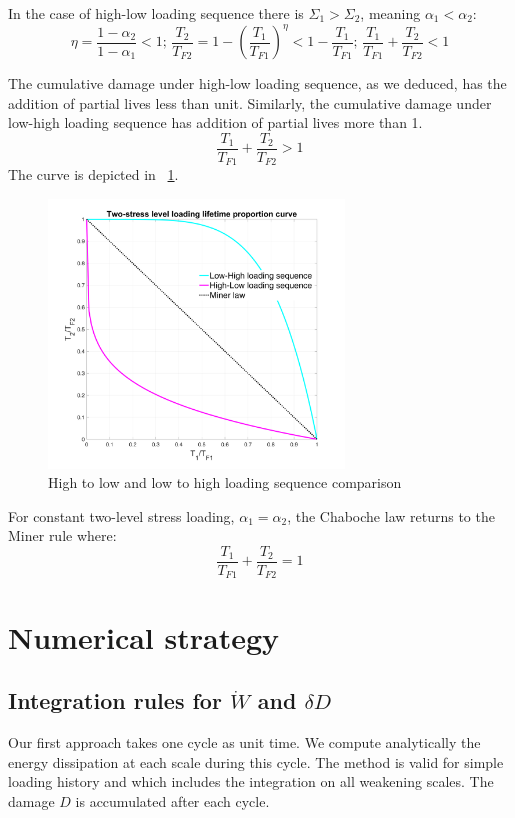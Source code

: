 \documentclass[3p,times,number,review]{elsarticle}
\newcommand{\figref}[1]{\figurename~\ref{#1}}
\begin{document}
In the case of high-low loading sequence there is $\Sigma_1>\Sigma_2$, meaning $\alpha_1<\alpha_2$:
$$\eta=\frac{1-\alpha_2}{1-\alpha_1}<1;\,
 \frac{T_2}{T_{F2}}=1-(\frac{T_1}{T_{F1}})^\eta<1-\frac{T_1}{T_{F1}};\,
\frac{T_1}{T_{F1}}+\frac{T_2}{T_{F2}}<1$$

The cumulative damage under high-low loading sequence, as we deduced, has the addition of partial lives less than unit. Similarly, the cumulative damage under low-high loading sequence has addition of partial lives more than 1.
$$\frac{T_1}{T_{F1}}+\frac{T_2}{T_{F2}}>1$$
 The curve is depicted in \figref{figsequence}.
\begin{figure}[!h]
	\centering
	\includegraphics[width=0.7\textwidth]{figures//sequence.png} 
	\caption{High to low and low to high loading sequence comparison}
	\label{figsequence}
\end{figure}
For constant two-level stress loading, $\alpha_1=\alpha_2$, the Chaboche law returns to the Miner rule where:
$$\frac{T_1}{T_{F1}}+\frac{T_2}{T_{F2}}=1$$

\section{Numerical strategy}
\subsection{Integration rules for $\dot{W}$ and $\delta D$}
Our first approach takes one cycle as unit time. We compute analytically the energy dissipation at each scale during this cycle. The method is valid for simple loading history and which includes the integration on all weakening scales. The damage $D$ is accumulated after each cycle.
\end{document}
